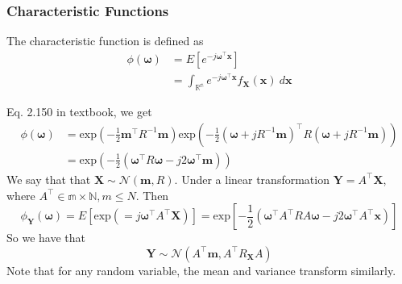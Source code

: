 \documentclass[a4paper]{article}
\begin{document}
\subsubsection*{Characteristic Functions}%
The characteristic function is defined as
\[
  \begin{aligned}
    \phi(\bm{\omega}) &= E \left[ e^{-j \bm{\omega}^\top \mathbf{x}} \right] \\
                      &= \int_{\mathds{R^n}} e^{-j\mathbf{\omega}^\top \mathbf{x}}f_{\mathbf{X}}(\mathbf{x}) \ d\mathbf{x}
  \end{aligned}
\]

Eq. 2.150 in textbook, we get
\[
  \begin{aligned}
    \phi(\bm{\omega}) &= \text{exp} \left( -\frac{1}{2} \mathbf{m}^\top R^{-1} \mathbf{m} \right) \text{exp} \left( -\frac{1}{2} (\bm{\omega} + j R^{-1}\mathbf{m})^\top R (\bm{\omega} + j R^{-1} \mathbf{m}) \right) \\
                      &= \text{exp}\left( -\frac{1}{2}\left( \bm{\omega}^\top R \bm{\omega} - j 2\bm{\omega}^\top \mathbf{m}  \right) \right)
  \end{aligned}
\]
We say that that $\mathbf{X} \sim \mathcal{N}(\mathbf{m}, R)$. Under a linear transformation $\mathbf{Y} = A^\top \mathbf{X}$, where $A^\top \in \mathds{m \times N}, m \leq N$. Then
\[
  \phi_{\mathbf{Y}}( \bm{\omega}) = E \left[ \text{exp} \left( =j \bm{\omega}^\top A^\top \mathbf{X} \right) \right] = \text{exp} \left[ -\frac{1}{2} \left( \bm{\omega}^\top A^\top R A \bm{\omega} - j2\bm{\omega}^\top A^\top \mathbf{x} \right) \right]
\]
So we have that 
\[ 
  \mathbf{Y} \sim \mathcal{N}(A^\top \mathbf{m}, A^\top R_{\mathbf{X}}A)
\]
Note that for any random variable, the mean and variance transform similarly.
\end{document}
